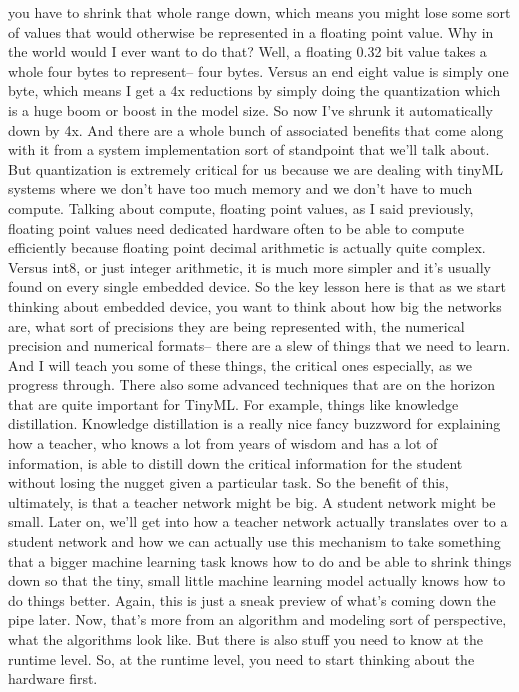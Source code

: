you have to shrink that whole range down,
which means you might lose some sort of values that would otherwise be
represented in a floating point value.
Why in the world would I ever want to do that?
Well, a floating 0.32 bit value takes a whole four bytes
to represent-- four bytes.
Versus an end eight value is simply one byte,
which means I get a 4x reductions by simply doing the quantization which is
a huge boom or boost in the model size.
So now I've shrunk it automatically down by 4x.
And there are a whole bunch of associated benefits
that come along with it from a system implementation sort of standpoint
that we'll talk about.
But quantization is extremely critical for us
because we are dealing with tinyML systems
where we don't have too much memory and we don't have to much compute.
Talking about compute, floating point values, as I said previously,
floating point values need dedicated hardware
often to be able to compute efficiently because floating point decimal
arithmetic is actually quite complex.
Versus int8, or just integer arithmetic, it is much more simpler
and it's usually found on every single embedded device.
So the key lesson here is that as we start thinking about embedded device,
you want to think about how big the networks are, what sort of precisions
they are being represented with, the numerical precision
and numerical formats-- there are a slew of things that we need to learn.
And I will teach you some of these things,
the critical ones especially, as we progress through.
There also some advanced techniques that are on the horizon
that are quite important for TinyML.
For example, things like knowledge distillation.
Knowledge distillation is a really nice fancy buzzword
for explaining how a teacher, who knows a lot from years of wisdom
and has a lot of information, is able to distill down
the critical information for the student without losing
the nugget given a particular task.
So the benefit of this, ultimately, is that a teacher network might be big.
A student network might be small.
Later on, we'll get into how a teacher network actually translates over
to a student network and how we can actually use this mechanism
to take something that a bigger machine learning task
knows how to do and be able to shrink things
down so that the tiny, small little machine learning model actually
knows how to do things better.
Again, this is just a sneak preview of what's coming down the pipe later.
Now, that's more from an algorithm and modeling sort of perspective,
what the algorithms look like.
But there is also stuff you need to know at the runtime level.
So, at the runtime level, you need to start thinking about the hardware
first.


